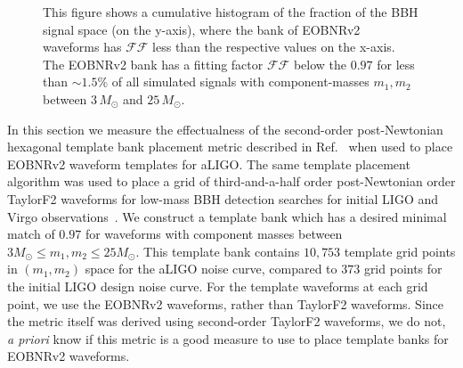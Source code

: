 \begin{figure}
	\begin{center}
	\end{center}
\caption{This figure shows a cumulative histogram of the fraction of the BBH
signal space (on the y-axis), where the bank of EOBNRv2 waveforms has
$\mathcal{FF}$ less than the respective values on the x-axis.  The EOBNRv2
bank has a fitting factor $\mathcal{FF}$ below the $0.97$ for less than $\sim
1.5\%$ of all simulated signals with component-masses $m_1, m_2$ between
$3\, M_\odot$ and $25\,M_{\odot}$.} \label{fig:cumhist_eobeob_all}
\end{figure} 

In this section we measure the effectualness of the second-order
post-Newtonian hexagonal template bank placement metric described in
Ref.~\citep{BabaketalBankPlacement} when used to place EOBNRv2 waveform
templates for aLIGO.  The same template placement algorithm was used to place
a grid of third-and-a-half order post-Newtonian order TaylorF2 waveforms for
low-mass BBH detection searches for initial LIGO and Virgo
observations~\citep{Colaboration:2011nz,Abadie:2010yb,Abbott:2009qj,Abbott:2009tt,Messaritaki:2005wv}.
We construct a template bank which
has a desired minimal match of $0.97$ for waveforms with component masses
between $3 M_\odot \le m_1, m_2 \le 25 M_\odot$. This template
bank contains $10,753$ template grid points in $(m_1,m_2)$ space for the aLIGO noise curve, 
compared to $373$ grid points for the initial LIGO design noise
curve. For the template waveforms at each grid point, we use the EOBNRv2
waveforms, rather than TaylorF2 waveforms.  Since the metric itself was
derived using second-order TaylorF2 waveforms, we do not, \textit{a priori}
know if this metric is a good measure to use to place template banks for
EOBNRv2 waveforms. 

